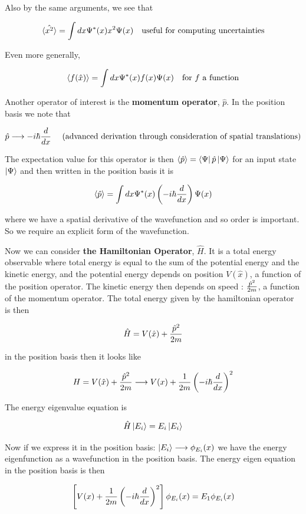 \documentclass[english, 11pt]{article}
\begin{document}
\begin{itemize}
      Also by the same arguments, we see that

      \[ \langle \hat{x^2} \rangle = \int dx \Psi^*(x) x^2 \Psi(x) \ \ \ \mbox{useful for computing uncertainties} \]

      Even more generally,

      \[ \langle f(\hat{x}) \rangle = \int dx \Psi^*(x) f(x) \Psi(x) \ \ \ \mbox{for $f$ a function} \]

      Another operator of interest is the \textbf{momentum operator}, $\hat{p}$. In the position basis we note that

      \[ \hat{p} \longrightarrow -i\hbar \frac{d}{dx} \ \ \ \ \mbox{(advanced derivation through consideration of spatial translations)} \]

      The expectation value for this operator is then $\langle \hat{p} \rangle = \left\langle\Psi\right|\hat{p}\left|\Psi\right\rangle$ for an input state $\left|\Psi\right\rangle$ and then written in the position basis it is

      \[ \langle \hat{p} \rangle = \int dx \Psi^*(x) \left( -i\hbar \frac{d}{dx} \right) \Psi(x) \]

      where we have a spatial derivative of the wavefunction and so order is important. So we require an explicit form of the wavefunction.\newline

      Now we can consider \textbf{the Hamiltonian Operator}, $\hat{H}$. It is a total energy observable where total energy is equal to the sum of the potential energy and the kinetic energy, and the potential energy depends on position $V(\hat{x})$, a function of the position operator. The kinetic energy then depends on speed : $\frac{\hat{p}^2}{2m}$, a function of the momentum operator. The total energy given by the hamiltonian operator is then

      \[ \hat{H} = V(\hat{x}) + \frac{\hat{p}^2}{2m} \]

      in the position basis then it looks like

      \[ H = V(\hat{x}) + \frac{\hat{p}^2}{2m} \longrightarrow V(x) + \frac{1}{2m} \left( -i\hbar \frac{d}{dx} \right)^2 \]

      The energy eigenvalue equation is

      \[ \hat{H}\left|E_i\right\rangle = E_i\left|E_i\right\rangle \]

      Now if we express it in the position basis: $\left|E_i\right\rangle \longrightarrow \phi_{E_i}(x)$ we have the energy eigenfunction as a wavefunction in the position basis. The energy eigen equation in the position basis is then

      \[ \left[ V(x) + \frac{1}{2m} \left( -i\hbar \frac{d}{d x} \right)^2 \right] \phi_{E_i}(x) = E_1 \phi_{E_i}(x) \]


\end{itemize}
\end{document}
